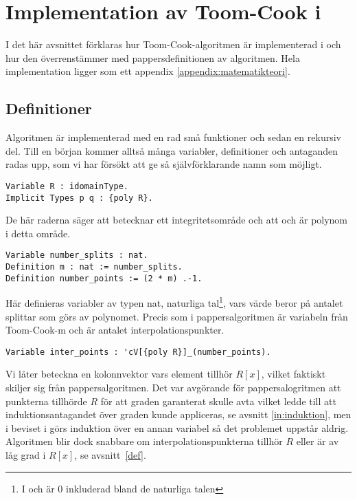 \section{Implementation av Toom-Cook i \coq{}}
\label{sec:formellimplementation}
I det här avsnittet förklaras hur Toom-Cook-algoritmen är implementerad i \ssr{}
och hur den överrenstämmer med pappersdefinitionen av algoritmen. Hela
implementation ligger som ett appendix \ref{appendix:matematikteori}.

\subsection{Definitioner}
Algoritmen är implementerad med en rad små funktioner och sedan en rekursiv
del. Till en början kommer alltså många variabler, definitioner och antaganden
radas upp, som vi har försökt att ge så självförklarande namn som möjligt.

\begin{lstlisting}
Variable R : idomainType.
Implicit Types p q : {poly R}.
\end{lstlisting}

De här raderna säger att  betecknar ett integritetsområde och att 
och  är polynom i detta område.

\begin{lstlisting}
Variable number_splits : nat.
Definition m : nat := number_splits.
Definition number_points := (2 * m) .-1.
\end{lstlisting}

Här definieras variabler av typen nat, naturliga tal\footnote{I \coq{} och \ssr{}
är 0 inkluderad bland de naturliga talen}, vars värde beror på antalet splittar
som görs av polynomet. Precis som i pappersalgoritmen är  variabeln från
Toom-Cook-m och  är antalet interpolationspunkter.

\begin{lstlisting}
Variable inter_points : 'cV[{poly R}]_(number_points).
\end{lstlisting}

Vi låter  beteckna en kolonnvektor vars element tillhör $R[x]$,
vilket faktiskt skiljer sig från pappersalgoritmen. Det var avgörande för
pappersalogritmen att punkterna tillhörde $R$ för att graden garanterat skulle
avta vilket ledde till att induktionsantagandet över graden kunde appliceras,
se avsnitt \ref{in:induktion}, men i beviset i\ssr{} görs induktion över en annan
variabel så det problemet uppstår aldrig. Algoritmen blir dock snabbare om
interpolationspunkterna tillhör $R$ eller är av låg grad i $R[x]$, se
avsnitt~\ref{def}.

